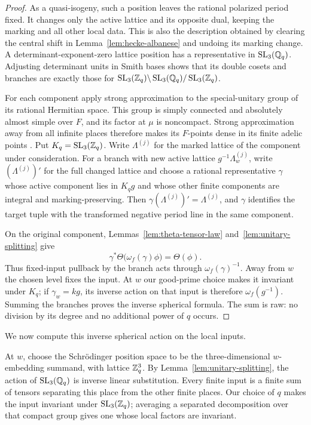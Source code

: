 \begin{proof}
As a quasi-isogeny, such a position leaves the rational polarized
period fixed.  It changes only the active lattice and its opposite
dual, keeping the marking and all other local data.  This is also
the description obtained by clearing the central shift in
Lemma~\ref{lem:hecke-albanese} and undoing its marking change.
A determinant-exponent-zero lattice position has a representative
in \(\operatorname{SL}_3(\mathbb{Q}_q)\).  Adjusting determinant units in Smith bases
shows that its double cosets and branches are exactly those for
\(\operatorname{SL}_3(\mathbb{Z}_q)\backslash\operatorname{SL}_3(\mathbb{Q}_q)/\operatorname{SL}_3(\mathbb{Z}_q)\).

For each component apply strong approximation to the
special-unitary group of its rational Hermitian space.  This
group is simply connected and absolutely almost simple over \(F\),
and its factor at \(\mu\) is noncompact.  Strong approximation
away from all infinite places therefore makes its \(F\)-points
dense in its finite adelic points
\cite[Theorem~4.16]{MilneShimura2017}.
Put \(K_q=\operatorname{SL}_3(\mathbb{Z}_q)\).  Write \(\Lambda^{(j)}\) for the marked
lattice of the component under consideration.  For a branch with
new active lattice \(g^{-1}\Lambda_w^{(j)}\), write
\((\Lambda^{(j)})'\) for the full changed lattice and choose a rational representative
\(\gamma\) whose active component lies in \(K_qg\) and whose other
finite components are integral and marking-preserving.  Then
\(\gamma(\Lambda^{(j)})'=\Lambda^{(j)}\), and \(\gamma\) identifies
the target tuple with the transformed negative period line in the
same component.

On the original component, Lemmas~\ref{lem:theta-tensor-law}
and~\ref{lem:unitary-splitting} give
\[
\gamma^*\Theta\bigl(\omega_f(\gamma)\phi\bigr)=\Theta(\phi).
\]
Thus fixed-input pullback by the branch acts through
\(\omega_f(\gamma)^{-1}\).  Away from \(w\) the chosen level fixes
the input.  At \(w\) our good-prime choice makes it invariant
under \(K_q\); if \(\gamma_w=kg\), its inverse action on that
input is therefore \(\omega_f(g^{-1})\).  Summing the branches
proves the inverse spherical formula.  The sum is raw: no
division by its degree and no additional power of \(q\) occurs.
\end{proof}

We now compute this inverse spherical action on the local inputs.

At \(w\), choose the Schrödinger position space to be the
three-dimensional \(w\)-embedding summand, with lattice \(\mathbb{Z}_q^3\).
By Lemma~\ref{lem:unitary-splitting}, the action of
\(\operatorname{SL}_3(\mathbb{Q}_q)\) is inverse linear substitution.  Every finite input
is a finite sum of tensors separating this place from the other
finite places.  Our choice of \(q\) makes the input invariant under
\(\operatorname{SL}_3(\mathbb{Z}_q)\); averaging a separated decomposition over that
compact group gives one whose local factors are invariant.

